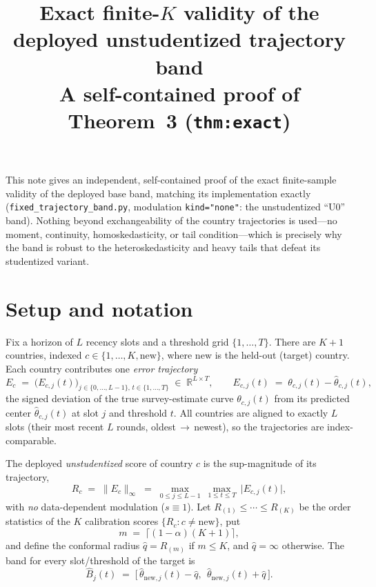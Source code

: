 \documentclass[12pt]{article}
\title{Exact finite-$K$ validity of the deployed unstudentized trajectory band\\
\large A self-contained proof of Theorem~3 (\texttt{thm:exact})}
\date{}
\theoremstyle{definition}
\theoremstyle{remark}
\begin{document}
\maketitle

This note gives an independent, self-contained proof of the exact finite-sample validity
of the deployed base band, matching its implementation exactly
(\texttt{fixed\_trajectory\_band.py}, modulation \texttt{kind="none"}: the unstudentized
``U0'' band). Nothing beyond exchangeability of the country trajectories is used---no
moment, continuity, homoskedasticity, or tail condition---which is precisely why the band
is robust to the heteroskedasticity and heavy tails that defeat its studentized variant.

\section*{Setup and notation}

Fix a horizon of $L$ recency slots and a threshold grid $\{1,\dots,T\}$. There are $K+1$
countries, indexed $c\in\{1,\dots,K,\mathrm{new}\}$, where $\mathrm{new}$ is the held-out
(target) country. Each country contributes one \emph{error trajectory}
\[
  E_c \;=\; \big(E_{c,j}(t)\big)_{j\in\{0,\dots,L-1\},\,t\in\{1,\dots,T\}} \;\in\; \mathbb{R}^{L\times T},
  \qquad
  E_{c,j}(t) \;=\; \theta_{c,j}(t) - \widehat\theta_{c,j}(t),
\]
the signed deviation of the true survey-estimate curve $\theta_{c,j}(t)$ from its predicted
center $\widehat\theta_{c,j}(t)$ at slot $j$ and threshold $t$. All countries are aligned to
exactly $L$ slots (their most recent $L$ rounds, oldest$\,\to\,$newest), so the trajectories
are index-comparable.

The deployed \emph{unstudentized} score of country $c$ is the sup-magnitude of its
trajectory,
\begin{equation}\label{eq:score}
  R_c \;=\; \|E_c\|_\infty \;=\; \max_{0\le j\le L-1}\ \max_{1\le t\le T}\ \big|E_{c,j}(t)\big|,
\end{equation}
with \emph{no} data-dependent modulation ($s\equiv 1$). Let $R_{(1)}\le\cdots\le R_{(K)}$ be
the order statistics of the $K$ calibration scores $\{R_c:c\ne\mathrm{new}\}$, put
\begin{equation}\label{eq:m}
  m \;=\; \big\lceil(1-\alpha)(K+1)\big\rceil,
\end{equation}
and define the conformal radius $\widehat q = R_{(m)}$ if $m\le K$, and $\widehat q=\infty$
otherwise. The band for every slot/threshold of the target is
\begin{equation}\label{eq:band}
  \widehat B_{j}(t) \;=\; \big[\,\widehat\theta_{\mathrm{new},j}(t)-\widehat q,\ \
  \widehat\theta_{\mathrm{new},j}(t)+\widehat q\,\big].
\end{equation}
\end{document}
